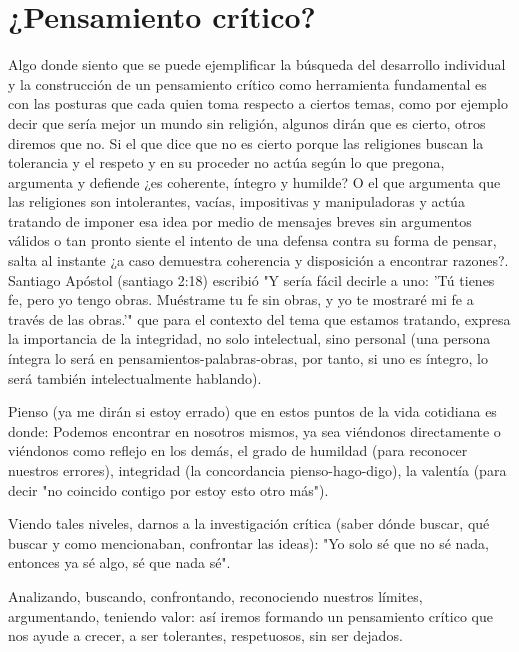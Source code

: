\chapter{¿Pensamiento crítico?}
Algo donde siento que se puede ejemplificar la búsqueda del desarrollo individual y la construcción de un pensamiento crítico como herramienta fundamental es con las posturas que cada quien toma respecto a ciertos temas, como por ejemplo decir que sería mejor un mundo sin religión, algunos dirán que es cierto, otros diremos que no. Si el que dice que no es cierto porque las religiones buscan la tolerancia y el respeto y en su proceder no actúa según lo que pregona, argumenta y defiende ¿es coherente, íntegro y humilde? O el que argumenta que las religiones son intolerantes, vacías, impositivas y manipuladoras y actúa tratando de imponer esa idea por medio de mensajes breves sin argumentos válidos o tan pronto siente el intento de una defensa contra su forma de pensar, salta al instante ¿a caso demuestra coherencia y disposición a encontrar razones?. Santiago Apóstol (santiago 2:18) escribió "Y sería fácil decirle a uno: 'Tú tienes fe, pero yo tengo obras. Muéstrame tu fe sin obras, y yo te mostraré mi fe a través de las obras.'" que para el contexto del tema que estamos tratando, expresa la importancia de la integridad, no solo intelectual, sino personal (una persona íntegra lo será en pensamientos-palabras-obras, por tanto, si uno es íntegro, lo será también intelectualmente hablando).

Pienso (ya me dirán si estoy errado) que en estos puntos de la vida cotidiana es donde:
Podemos encontrar en nosotros mismos, ya sea viéndonos directamente o viéndonos como reflejo en los demás, el grado de humildad (para reconocer nuestros errores), integridad (la concordancia pienso-hago-digo), la valentía (para decir "no coincido contigo por estoy esto otro más").

Viendo tales niveles, darnos a la investigación crítica (saber dónde buscar, qué buscar y como mencionaban, confrontar las ideas): "Yo solo sé que no sé nada, entonces ya sé algo, sé que nada sé".

Analizando, buscando, confrontando, reconociendo nuestros límites, argumentando, teniendo valor: así iremos formando un pensamiento crítico que nos ayude a crecer, a ser tolerantes, respetuosos, sin ser dejados.